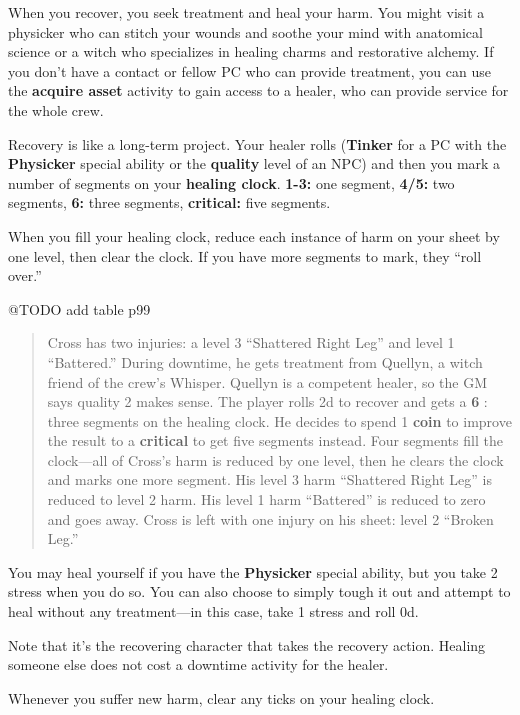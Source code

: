 \documentclass[11pt,oneside]{book}
\newcommand{\gameterm}[1]{\textbf{#1}}
\begin{document}
When you recover, you seek treatment and heal your harm. You might visit a physicker who can stitch your wounds and soothe your mind with anatomical science or a witch who specializes in healing charms and restorative alchemy. If you don’t have a contact or fellow PC who can provide treatment, you can use the \textbf{acquire asset} activity to gain access to a healer, who can provide service for the whole crew.

Recovery is like a long-term project. Your healer rolls (\gameterm{Tinker}  for a PC with the \gameterm{Physicker}  special ability or the \textbf{quality} level of an NPC) and then you mark a number of segments on your \textbf{healing clock}. \gameterm{1-3:}  one segment, \gameterm{4/5:}  two segments, \gameterm{6:}  three segments, \gameterm{critical:}  five segments.

When you fill your healing clock, reduce each instance of harm on your sheet by one level, then clear the clock. If you have more segments to mark, they “roll over.”

@TODO add table p99

\begin{quote}
	Cross has two injuries: a level 3 “Shattered Right Leg” and level 1 “Battered.” During downtime, he gets treatment from Quellyn, a witch friend of the crew’s Whisper. Quellyn is a competent healer, so the GM says quality 2 makes sense. The player rolls 2d to recover and gets a \gameterm{6} : three segments on the healing clock. He decides to spend 1 \gameterm{coin}  to improve the result to a \gameterm{critical}  to get five segments instead. Four segments fill the clock---all of Cross’s harm is reduced by one level, then he clears the clock and marks one more segment. His level 3 harm “Shattered Right Leg” is reduced to level 2 harm. His level 1 harm “Battered” is reduced to zero and goes away. Cross is left with one injury on his sheet: level 2 “Broken Leg.”
\end{quote} 

You may heal yourself if you have the \gameterm{Physicker}  special ability, but you take 2 stress when you do so. You can also choose to simply tough it out and attempt to heal without any treatment---in this case, take 1 stress and roll 0d.

Note that it’s the recovering character that takes the recovery action. Healing someone else does not cost a downtime activity for the healer.

Whenever you suffer new harm, clear any ticks on your healing clock.
\end{document}
